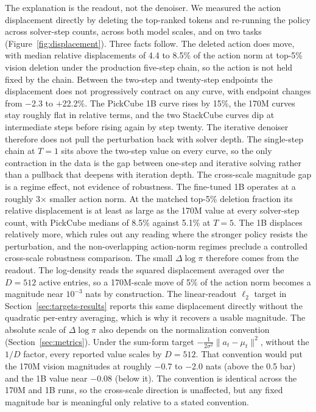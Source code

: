 \documentclass{article}
\begin{document}
The explanation is the readout, not the denoiser.
We measured the action displacement directly by deleting the top-ranked tokens and re-running the policy across solver-step counts, across both model scales, and on two tasks (Figure~\ref{fig:displacement}).
Three facts follow.
The deleted action does move, with median relative displacements of 4.4 to 8.5\% of the action norm at top-5\% vision deletion under the production five-step chain, so the action is not held fixed by the chain.
Between the two-step and twenty-step endpoints the displacement does not progressively contract on any curve, with endpoint changes from $-$2.3 to $+$22.2\%.
The PickCube 1B curve rises by 15\%, the 170M curves stay roughly flat in relative terms, and the two StackCube curves dip at intermediate steps before rising again by step twenty.
The iterative denoiser therefore does not pull the perturbation back with solver depth.
The single-step chain at $T{=}1$ sits above the two-step value on every curve, so the only contraction in the data is the gap between one-step and iterative solving rather than a pullback that deepens with iteration depth.
The cross-scale magnitude gap is a regime effect, not evidence of robustness.
The fine-tuned 1B operates at a roughly 3$\times$ smaller action norm.
At the matched top-5\% deletion fraction its relative displacement is at least as large as the 170M value at every solver-step count, with PickCube medians of 8.5\% against 5.1\% at $T{=}5$.
The 1B displaces relatively more, which rules out any reading where the stronger policy resists the perturbation, and the non-overlapping action-norm regimes preclude a controlled cross-scale robustness comparison.
The small $\Delta\log\pi$ therefore comes from the readout.
The log-density reads the squared displacement averaged over the $D{=}512$ active entries, so a 170M-scale move of 5\% of the action norm becomes a magnitude near $10^{-3}$ nats by construction.
The linear-readout $\ell_2$ target in Section~\ref{sec:targets-results} reports this same displacement directly without the quadratic per-entry averaging, which is why it recovers a usable magnitude.
The absolute scale of $\Delta\log\pi$ also depends on the normalization convention (Section~\ref{sec:metrics}).
Under the sum-form target $-\frac{1}{2\sigma^2}\lVert a_t - \mu_t \rVert^2$, without the $1/D$ factor, every reported value scales by $D{=}512$.
That convention would put the 170M vision magnitudes at roughly $-$0.7 to $-$2.0 nats (above the 0.5 bar) and the 1B value near $-$0.08 (below it).
The convention is identical across the 170M and 1B runs, so the cross-scale direction is unaffected, but any fixed magnitude bar is meaningful only relative to a stated convention.
\end{document}
